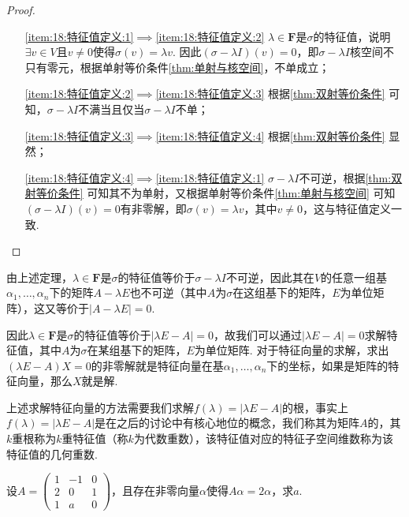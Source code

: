 \begin{proof}
    \begin{itemize}
        \item[\ref*{item:18:特征值定义:1}$\implies$\ref*{item:18:特征值定义:2}] $\lambda\in\mathbf{F}$是$\sigma$的特征值，说明$\exists v\in V$且$v\neq 0$使得$\sigma(v)=\lambda v$. 因此$(\sigma-\lambda I)(v)=0$，即$\sigma-\lambda I$核空间不只有零元，根据单射等价条件\autoref{thm:单射与核空间}，不单成立；

        \item[\ref*{item:18:特征值定义:2}$\implies$\ref*{item:18:特征值定义:3}] 根据\autoref{thm:双射等价条件} 可知，$\sigma-\lambda I$不满当且仅当$\sigma-\lambda I$不单；

        \item[\ref*{item:18:特征值定义:3}$\implies$\ref*{item:18:特征值定义:4}] 根据\autoref*{thm:双射等价条件} 显然；

        \item[\ref*{item:18:特征值定义:4}$\implies$\ref*{item:18:特征值定义:1}] $\sigma-\lambda I$不可逆，根据\autoref*{thm:双射等价条件} 可知其不为单射，又根据单射等价条件\autoref*{thm:单射与核空间} 可知$(\sigma-\lambda I)(v)=0$有非零解，即$\sigma(v)=\lambda v$，其中$v\neq 0$，这与特征值定义一致.
    \end{itemize}
\end{proof}

由上述定理，$\lambda\in\mathbf{F}$是$\sigma$的特征值等价于$\sigma-\lambda I$不可逆，因此其在$V$的任意一组基$\alpha_1,\ldots,\alpha_n$下的矩阵$A-\lambda E$也不可逆（其中$A$为$\sigma$在这组基下的矩阵，$E$为单位矩阵），这又等价于$|A-\lambda E|=0$.

因此$\lambda\in\mathbf{F}$是$\sigma$的特征值等价于$|\lambda E-A|=0$，故我们可以通过$|\lambda E-A|=0$求解特征值，其中$A$为$\sigma$在某组基下的矩阵，$E$为单位矩阵. 对于特征向量的求解，求出$(\lambda E-A)X=0$的非零解就是特征向量在基$\alpha_1,\ldots,\alpha_n$下的坐标，如果是矩阵的特征向量，那么$X$就是解.

上述求解特征向量的方法需要我们求解$f(\lambda)=|\lambda E-A|$的根，事实上$f(\lambda)=|\lambda E-A|$是在之后的讨论中有核心地位的概念，我们称其为矩阵$A$的，其$k$重根称为$k$重特征值（称$k$为代数重数），该特征值对应的特征子空间维数称为该特征值的几何重数.

\begin{example}{}{}
    设$A=\begin{pmatrix}
            1 & -1 & 0 \\ 2 & 0 & 1 \\ 1 & a & 0
        \end{pmatrix}$，且存在非零向量$\alpha$使得$A\alpha=2\alpha$，求$a$.
\end{example}

